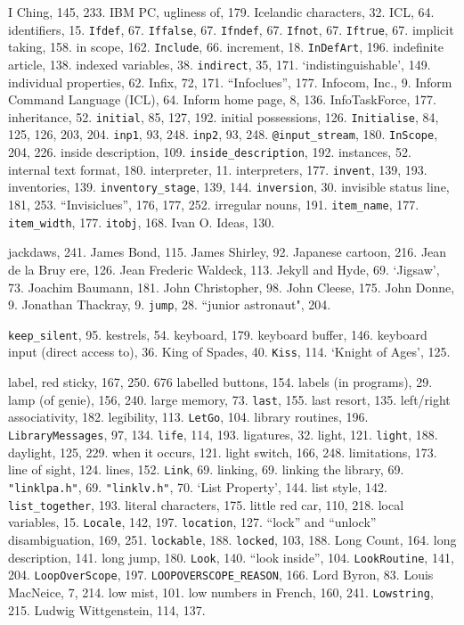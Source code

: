 I Ching, 145, 233.
IBM PC, ugliness of, 179.
Icelandic characters, 32.
ICL, 64.
identifiers, 15.
{{\tt Ifdef}}, 67.
{{\tt Iffalse}}, 67.
{{\tt Ifndef}}, 67.
{{\tt Ifnot}}, 67.
{{\tt Iftrue}}, 67.
implicit taking, 158.
in scope, 162.
{{\tt Include}}, 66.
increment, 18.
{{\tt InDefArt}}, 196.
indefinite article, 138.
indexed variables, 38.
{{\tt indirect}}, 35, 171.
`indistinguishable', 149.
individual properties, 62.
Infix, 72, 171.
``Infoclues'', 177.
Infocom, Inc., 9.
Inform Command Language (ICL), 64.
Inform home page, 8, 136.
InfoTaskForce, 177.
inheritance, 52.
{{\tt initial}}, 85, 127, 192.
initial possessions, 126.
{{\tt Initialise}}, 84, 125, 126, 203, 204.
{{\tt inp1}}, 93, 248.
{{\tt inp2}}, 93, 248.
{{\tt @input\_stream}}, 180.
{{\tt InScope}}, 204, 226.
inside description, 109.
{{\tt inside\_description}}, 192.
instances, 52.
internal text format, 180.
interpreter, 11.
interpreters, 177.
{{\tt invent}}, 139, 193.
inventories, 139.
{{\tt inventory\_stage}}, 139, 144.
{{\tt inversion}}, 30.
invisible status line, 181, 253.
``Invisiclues'', 176, 177, 252.
irregular nouns, 191.
{{\tt item\_name}}, 177.
{{\tt item\_width}}, 177.
{{\tt itobj}}, 168.
Ivan O. Ideas, 130.

jackdaws, 241.
James Bond, 115.
James Shirley, 92.
Japanese cartoon, 216.
Jean de la Bruy{ e}re, 126.
Jean Frederic Waldeck, 113.
Jekyll and Hyde, 69.
`Jigsaw', 73.
Joachim Baumann, 181.
John Christopher, 98.
John Cleese, 175.
John Donne, 9.
Jonathan Thackray, 9.
{{\tt jump}}, 28.
``junior astronaut", 204.

{{\tt keep\_silent}}, 95.
kestrels, 54.
keyboard, 179.
keyboard buffer, 146.
keyboard input (direct access to), 36.
King of Spades, 40.
{{\tt Kiss}}, 114.
`Knight of Ages', 125.

label, red sticky, 167, 250.
676 labelled buttons, 154.
labels (in programs), 29.
lamp (of genie), 156, 240.
large memory, 73.
{{\tt last}}, 155.
last resort, 135.
left/right associativity, 182.
legibility, 113.
{{\tt LetGo}}, 104.
library routines, 196.
{{\tt LibraryMessages}}, 97, 134.
{{\tt life}}, 114, 193.
ligatures, 32.
light, 121.
{{\tt light}}, 188.
\quad  daylight, 125, 229.
\quad  when it occurs, 121.
light switch, 166, 248.
limitations, 173.
line of sight, 124.
lines, 152.
{{\tt Link}}, 69.
linking, 69.
linking the library, 69.
{{\tt "linklpa.h"}}, 69.
{{\tt "linklv.h"}}, 70.
`List Property', 144.
list style, 142.
{{\tt list\_together}}, 193.
literal characters, 175.
little red car, 110, 218.
local variables, 15.
{{\tt Locale}}, 142, 197.
{{\tt location}}, 127.
``lock'' and ``unlock'' disambiguation, 169, 251.
{{\tt lockable}}, 188.
{{\tt locked}}, 103, 188.
Long Count, 164.
long description, 141.
long jump, 180.
{{\tt Look}}, 140.
``look inside'', 104.
{{\tt LookRoutine}}, 141, 204.
{{\tt LoopOverScope}}, 197.
{{\tt LOOPOVERSCOPE\_REASON}}, 166.
Lord Byron, 83.
Louis MacNeice, 7, 214.
low mist, 101.
low numbers in French, 160, 241.
{{\tt Lowstring}}, 215.
Ludwig Wittgenstein, 114, 137.

